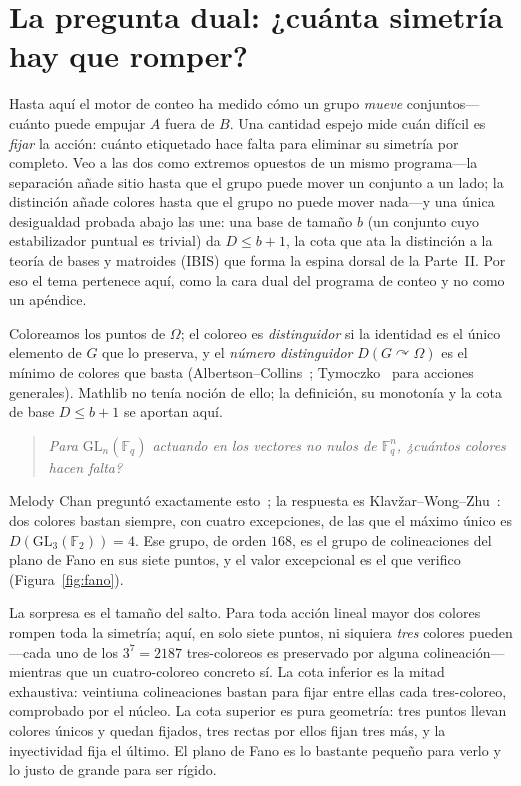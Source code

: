 \documentclass[11pt]{article}
\newcommand{\GL}{\mathrm{GL}}
\begin{document}
\section{La pregunta dual: ¿cuánta simetría hay que romper?}
\label{sec:distinguishing}

Hasta aquí el motor de conteo ha medido cómo un grupo \emph{mueve} conjuntos---cuánto
puede empujar $A$ fuera de $B$. Una cantidad espejo mide cuán difícil es \emph{fijar}
la acción: cuánto etiquetado hace falta para eliminar su simetría por completo. Veo a
las dos como extremos opuestos de un mismo programa---la separación añade sitio hasta
que el grupo puede mover un conjunto a un lado; la distinción añade colores hasta que
el grupo no puede mover nada---y una única desigualdad probada abajo las une: una base
de tamaño $b$ (un conjunto cuyo estabilizador puntual es trivial) da $D\le b+1$, la
cota que ata la distinción a la teoría de bases y matroides (IBIS) que forma la
espina dorsal de la Parte~II. Por eso el tema pertenece aquí, como la cara dual del
programa de conteo y no como un apéndice.

Coloreamos los puntos de $\Omega$; el coloreo es \emph{distinguidor} si la identidad es
el único elemento de $G$ que lo preserva, y el \emph{número distinguidor}
$D(G\curvearrowright\Omega)$ es el mínimo de colores que basta
(Albertson--Collins~\cite{AlbertsonCollins1996}; Tymoczko~\cite{Tymoczko2004} para
acciones generales). Mathlib no tenía noción de ello; la definición, su monotonía y la
cota de base $D\le b+1$ se aportan aquí.

\begin{quote}\itshape
  Para $\GL_n(\mathbb{F}_q)$ actuando en los vectores no nulos de $\mathbb{F}_q^n$,
  ¿cuántos colores hacen falta?
\end{quote}
Melody Chan preguntó exactamente esto~\cite{Chan2006}; la respuesta es
Klavžar--Wong--Zhu~\cite{KWZ2006}: dos colores bastan siempre, con cuatro excepciones,
de las que el máximo único es $D(\GL_3(\mathbb{F}_2))=4$. Ese grupo, de orden $168$, es
el grupo de colineaciones del plano de Fano en sus siete puntos, y el valor excepcional
es el que verifico (Figura~\ref{fig:fano}).

La sorpresa es el tamaño del salto. Para toda acción lineal mayor dos colores rompen
toda la simetría; aquí, en solo siete puntos, ni siquiera \emph{tres} colores
pueden---cada uno de los $3^7=2187$ tres-coloreos es preservado por alguna
colineación---mientras que un cuatro-coloreo concreto sí. La cota inferior es la mitad
exhaustiva: veintiuna colineaciones bastan para fijar entre ellas cada tres-coloreo,
comprobado por el núcleo. La cota superior es pura geometría: tres puntos llevan
colores únicos y quedan fijados, tres rectas por ellos fijan tres más, y la
inyectividad fija el último. El plano de Fano es lo bastante pequeño para verlo y lo
justo de grande para ser rígido.
\end{document}
